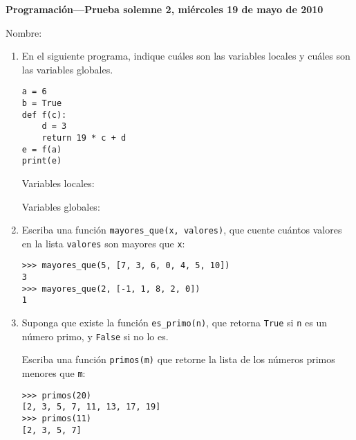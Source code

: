 \documentclass[11pt,spanish]{article}
\newcommand{\onelinerule}{\rule[2.3ex]{0pt}{0pt}}
\newcommand{\nombre}{\framebox[0.8\textwidth]{\onelinerule}}
\begin{document}
  \thispagestyle{empty}
  \pagestyle{empty}
  {\Large\bfseries Programación---Prueba solemne 2, miércoles 19 de mayo de 2010}

  Nombre: \nombre

  \begin{enumerate}
    \item
      En el siguiente programa,
      indique cuáles son las variables locales
      y cuáles son las variables globales.

      \begin{minipage}{14em}
          \begin{lstlisting}[frame=single]
a = 6
b = True
def f(c):
    d = 3
    return 19 * c + d
e = f(a)
print(e)
          \end{lstlisting}
      \end{minipage}
      \hspace{4em}
      \begin{minipage}{20em}
          Variables locales:

          \framebox[\textwidth]{\rule[5.0ex]{0pt}{0pt}}

          Variables globales:

          \framebox[\textwidth]{\rule[5.0ex]{0pt}{0pt}}
      \end{minipage}

    \item
      Escriba una función \lstinline+mayores_que(x, valores)+,
      que cuente cuántos valores en la lista \lstinline+valores+
      son mayores que \lstinline+x+:
      \begin{lstlisting}
>>> mayores_que(5, [7, 3, 6, 0, 4, 5, 10])
3
>>> mayores_que(2, [-1, 1, 8, 2, 0])
1
      \end{lstlisting}

      \framebox[\textwidth]{\rule[20.0ex]{0pt}{0pt}}

    \item
      Suponga que existe
      la función \lstinline+es_primo(n)+,
      que retorna \lstinline+True+
      si \lstinline+n+ es un número primo,
      y \lstinline+False+ si no lo es.

      Escriba una función \lstinline+primos(m)+
      que retorne la lista
      de los números primos menores que \lstinline+m+:
      \begin{lstlisting}
>>> primos(20)
[2, 3, 5, 7, 11, 13, 17, 19]
>>> primos(11)
[2, 3, 5, 7]
      \end{lstlisting}

      \framebox[\textwidth]{\rule[20.0ex]{0pt}{0pt}}


\end{enumerate}
\end{document}
